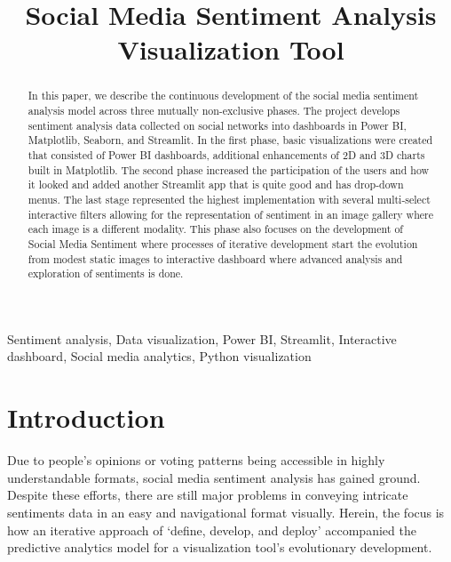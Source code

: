 \documentclass[conference]{IEEEtran}
\begin{document}
\title{Social Media Sentiment Analysis Visualization Tool}

\author{
\and
{}
\and
{}
}

\maketitle

\begin{abstract}
In this paper, we describe the continuous development of the social media sentiment analysis model across three mutually non-exclusive phases. The project develops sentiment analysis data collected on social networks into dashboards in Power BI, Matplotlib, Seaborn, and Streamlit. In the first phase, basic visualizations were created that consisted of Power BI dashboards, additional enhancements of 2D and 3D charts built in Matplotlib. The second phase increased the participation of the users and how it looked and added another Streamlit app that is quite good and has drop-down menus. The last stage represented the highest implementation with several multi-select interactive filters allowing for the representation of sentiment in an image gallery where each image is a different modality. This phase also focuses on the development of Social Media Sentiment where processes of iterative development start the evolution from modest static images to interactive dashboard where advanced analysis and exploration of sentiments is done.
\end{abstract}

\begin{IEEEkeywords}
Sentiment analysis, Data visualization, Power BI, Streamlit, Interactive dashboard, Social media analytics, Python visualization
\end{IEEEkeywords}

\section{Introduction}
Due to people's opinions or voting patterns being accessible in highly understandable formats, social media sentiment analysis has gained ground. Despite these efforts, there are still major problems in conveying intricate sentiments data in an easy and navigational format visually. Herein, the focus is how an iterative approach of ‘define, develop, and deploy’ accompanied the predictive analytics model for a visualization tool’s evolutionary development. 
\end{document}
